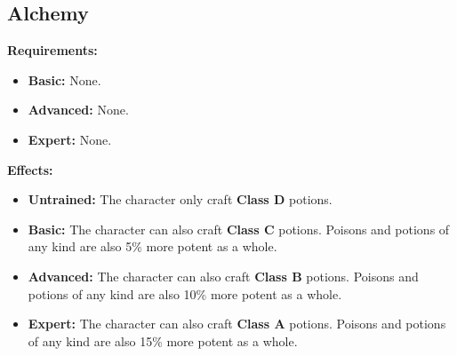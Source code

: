\subsection{Alchemy}
\begin{table}[!ht]
\centering
{}
\end{table}\newpage
\textbf{Requirements:}
\begin{itemize}
	\item \textbf{Basic:} None.
	\item \textbf{Advanced:} None.
	\item \textbf{Expert:} None.
\end{itemize}
\textbf{Effects:}
\begin{itemize}
	\item \textbf{Untrained:} The character only craft \textbf{Class D} potions.
	\item \textbf{Basic:} The character can also craft \textbf{Class C} potions. Poisons and potions of any kind are also 5\% more potent as a whole.
	\item \textbf{Advanced:} The character can also craft \textbf{Class B} potions. Poisons and potions of any kind are also 10\% more potent as a whole.
	\item \textbf{Expert:} The character can also craft \textbf{Class A} potions. Poisons and potions of any kind are also 15\% more potent as a whole.
\end{itemize}\newpage
